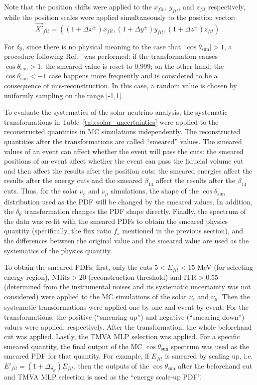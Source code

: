 Note that the position shifts were applied to the $x_{fit},~y_{fit}$, and $z_{fit}$ respectively, while the position scales were applied simultaneously to the position vector: 
\begin{equation*}
\vec{X'}_{fit}=((1+ \Delta x^\pm)x_{fit},(1+ \Delta y^\pm)y_{fit},(1+ \Delta z^\pm)z_{fit})\; .
\end{equation*}

For $\delta_\theta$, since there is no physical meaning to the case that $\vert \cos\theta_\mathrm{sun} \vert >1$, a procedure following Ref.~\cite{waterunidoc} was performed: if the transformation causes $\cos\theta_\mathrm{sun}>1$, the smeared value is reset to 0.999; on the other hand, the $\cos\theta_\mathrm{sun}<-1$ case happens more frequently and is considered to be a consequence of mis-reconstruction. In this case, a random value is chosen by uniformly sampling on the range [-1,1].

To evaluate the systematics of the solar neutrino analysis, the systematic transformations in Table~\ref{tab:solar_uncertainties} were applied to the reconstructed quantities in MC simulations independently. The reconstructed quantities after the transformations are called ``smeared'' values. The smeared values of an event can affect whether the event will pass the cuts: the smeared positions of an event affect whether the event can pass the fiducial volume cut and then affect the results after the position cuts; the smeared energies affect the results after the energy cuts and the smeared $\beta_{14}$ affect the results after the $\beta_{14}$ cuts. Thus, for the solar $\nu_e$ and $\nu_\mu$ simulations, the shape of the $\cos\theta_\mathrm{sun}$ distribution used as the PDF will be changed by the smeared values. In addition, the $\delta_\theta$ transformation changes the PDF shape directly. Finally, the spectrum of the data was re-fit with the smeared PDFs to obtain the smeared physics quantity (specifically, the flux ratio $f_s$ mentioned in the previous section), and the differences between the original value and the smeared value are used as the systematics of the physics quantity.

To obtain the smeared PDFs, first, only the cuts $5<E_{fit}<15$ MeV (for selecting energy region), $\mathrm{NHits}>20$ (reconstruction threshold) and $\mathrm{ITR}>0.55$ (determined from the instrumental noises and its systematic uncertainty was not considered) were applied to the MC simulations of the solar $\nu_e$ and $\nu_\mu$. Then the systematic transformations were applied one by one and event by event. For the transformations, the positive (``smearing up'') and negative (``smearing down'') values were applied, respectively. After the transformation, the whole beforehand cut was applied. Lastly, the TMVA MLP selection was applied. For a specific smeared quantity, the final output of the MC $\cos\theta_\mathrm{sun}$ spectrum was used as the smeared PDF for that quantity. For example, if $E_{fit}$ is smeared by scaling up, i.e. $E'_{fit}=(1+\Delta_{\delta_E})E_{fit}$, then the outputs of the $\cos\theta_\mathrm{sun}$ after the beforehand cut and TMVA MLP selection is used as the ``energy scale-up PDF''.

